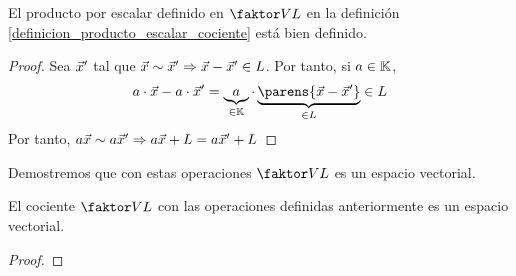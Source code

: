 \documentclass[../algebra_lineal.tex]{subfiles}
\begin{document}
\begin{proposition}
    El producto por escalar definido en $\qs{V}{L}$ en la definición \ref{definicion_producto_escalar_cociente} está bien definido. 
\end{proposition}

\begin{proof}
    Sea $\vec{x}'$ tal que $\vec{x} \sim \vec{x}' \Rightarrow \vec{x} - \vec{x}' \in L$. Por tanto, si $a \in \mathbb{K}$,
    \[
        a \cdot \vx - a \cdot \vx' = \underbrace{a}_{\in \K} \cdot \underbrace{\parens{\vx - \vx'}}_{\in L} \in L
    \]
    Por tanto, $a \vec{x} \sim a \vec{x}' \Rightarrow a \vec{x} + L = a \vec{x}' + L$
\end{proof}

Demostremos que con estas operaciones $\qs{V}{L}$ es un espacio vectorial.

\begin{proposition}
    El cociente $\qs{V}{L}$ con las operaciones definidas anteriormente es un espacio vectorial.    
\end{proposition}
\begin{proof}
\end{proof}
\end{document}

